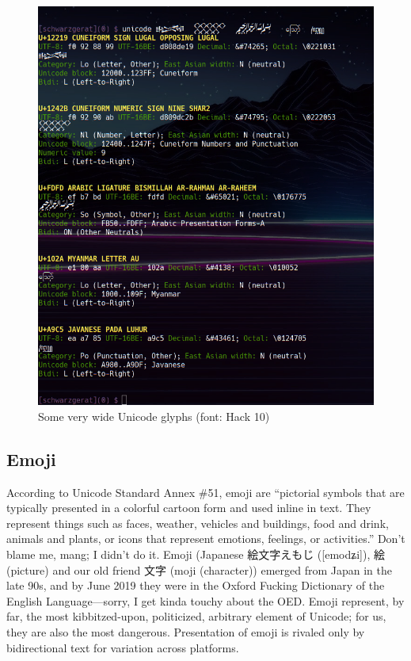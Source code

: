 \begin{figure}[!htb]
\centering
\includegraphics[width=1\linewidth]{media/wide-unicode.png}
\caption[Some very wide Unicode glyphs]{Some very wide Unicode glyphs (font: Hack 10)}
\label{fig:wideglyphs}
\end{figure}

\subsection{Emoji}
According to Unicode Standard Annex \#51\cite{annex51}, emoji are ``pictorial
symbols that are typically presented in a colorful cartoon form and used
inline in text. They represent things such as faces, weather, vehicles and
buildings, food and drink, animals and plants, or icons that represent
emotions, feelings, or activities.''
Don't blame me, mang; I didn't do it. Emoji (Japanese 絵文字えもじ ([{emodʑi}]),
絵 (picture) and our old friend 文字 (moji (character)) emerged from Japan
in the late 90s, and by June 2019 they were in the Oxford Fucking Dictionary of
the English Language\cite{oedgay}---sorry, I get kinda touchy about the OED.
Emoji represent, by far, the most kibbitzed-upon, politicized, arbitrary
element of Unicode; for us, they are also the most dangerous. Presentation of
emoji is rivaled only by bidirectional text for variation across platforms.

